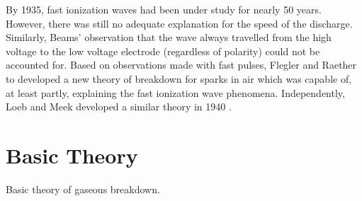 By 1935, fast ionization waves had been under study for nearly 50 years.
However, there was still no adequate explanation for the speed of the discharge.
Similarly, Beams' observation that the wave always travelled from the high
voltage to the low voltage electrode (regardless of polarity) could not be
accounted for. Based on observations made with fast pulses, Flegler and Raether
to developed a new theory of breakdown for sparks in air \cite{Flegler1936}
which was capable of, at least partly, explaining the fast ionization wave
phenomena. Independently, Loeb and Meek developed a similar theory in 1940
\cite{Loeb1940}.

\section{Basic Theory}

Basic theory of gaseous breakdown.
